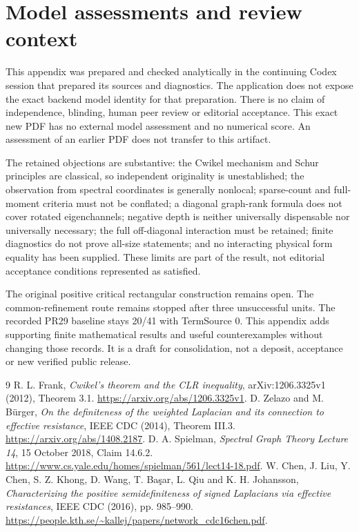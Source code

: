 \documentclass[11pt,a4paper]{article}
\begin{document}
\section{Model assessments and review context}
This appendix was prepared and checked analytically in the continuing Codex
session that prepared its sources and diagnostics. The application does not
expose the exact backend model identity for that preparation. There is no
claim of independence, blinding, human peer review or editorial acceptance.
This exact new PDF has no external model assessment and no numerical score.
An assessment of an earlier PDF does not transfer to this artifact.

The retained objections are substantive: the Cwikel mechanism and Schur
principles are classical, so independent originality is unestablished; the
observation from spectral coordinates is generally nonlocal; sparse-count
and full-moment criteria must not be conflated; a diagonal graph-rank formula
does not cover rotated eigenchannels; negative depth is neither universally
dispensable nor universally necessary; the full off-diagonal interaction must
be retained; finite diagnostics do not prove all-size statements; and no
interacting physical form equality has been supplied. These limits are part
of the result, not editorial acceptance conditions represented as satisfied.

The original positive critical rectangular construction remains open.
The common-refinement route remains stopped after three unsuccessful units.
The recorded PR29 baseline stays 20/41 with TermSource 0. This appendix adds
supporting finite mathematical results and useful counterexamples without
changing those records. It is a draft for consolidation, not a deposit,
acceptance or new verified public release.

\begin{thebibliography}{9}
 R. L. Frank, \emph{Cwikel's theorem and the CLR inequality},
arXiv:1206.3325v1 (2012), Theorem 3.1.
\url{https://arxiv.org/abs/1206.3325v1}.
 D. Zelazo and M. B\"urger, \emph{On the definiteness of the
weighted Laplacian and its connection to effective resistance},
IEEE CDC (2014), Theorem III.3.
\url{https://arxiv.org/abs/1408.2187}.
 D. A. Spielman, \emph{Spectral Graph Theory Lecture 14},
15 October 2018, Claim 14.6.2.
\url{https://www.cs.yale.edu/homes/spielman/561/lect14-18.pdf}.
 W. Chen, J. Liu, Y. Chen, S. Z. Khong, D. Wang,
T. Ba\c{s}ar, L. Qiu and K. H. Johansson, \emph{Characterizing the positive
semidefiniteness of signed Laplacians via effective resistances},
IEEE CDC (2016), pp. 985--990.
\url{https://people.kth.se/~kallej/papers/network_cdc16chen.pdf}.
\end{thebibliography}
\end{document}
